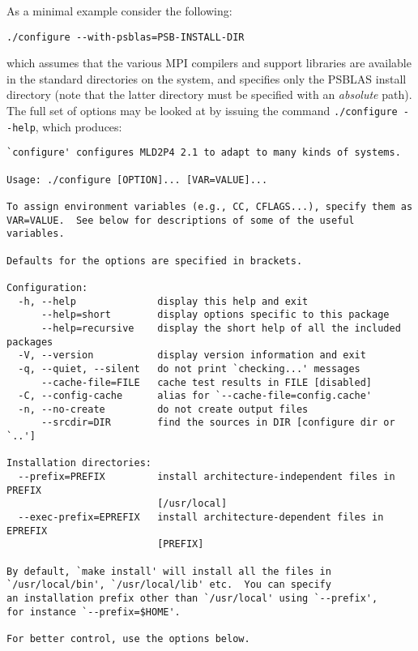 As a minimal example consider the following:
\begin{verbatim}
./configure --with-psblas=PSB-INSTALL-DIR
\end{verbatim}
which assumes that the various MPI compilers and support libraries are
available in the standard directories on the system, and specifies
only the PSBLAS install  directory (note that the latter directory must
be specified with an {\em absolute} path).
The full set of options may be looked at by issuing the command
\verb|./configure --help|, which produces:
\begin{verbatim}
`configure' configures MLD2P4 2.1 to adapt to many kinds of systems.

Usage: ./configure [OPTION]... [VAR=VALUE]...

To assign environment variables (e.g., CC, CFLAGS...), specify them as
VAR=VALUE.  See below for descriptions of some of the useful variables.

Defaults for the options are specified in brackets.

Configuration:
  -h, --help              display this help and exit
      --help=short        display options specific to this package
      --help=recursive    display the short help of all the included packages
  -V, --version           display version information and exit
  -q, --quiet, --silent   do not print `checking...' messages
      --cache-file=FILE   cache test results in FILE [disabled]
  -C, --config-cache      alias for `--cache-file=config.cache'
  -n, --no-create         do not create output files
      --srcdir=DIR        find the sources in DIR [configure dir or `..']

Installation directories:
  --prefix=PREFIX         install architecture-independent files in PREFIX
                          [/usr/local]
  --exec-prefix=EPREFIX   install architecture-dependent files in EPREFIX
                          [PREFIX]

By default, `make install' will install all the files in
`/usr/local/bin', `/usr/local/lib' etc.  You can specify
an installation prefix other than `/usr/local' using `--prefix',
for instance `--prefix=$HOME'.

For better control, use the options below.


\end{verbatim}
